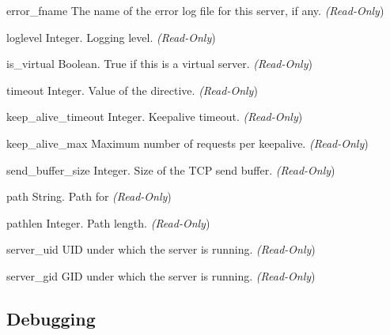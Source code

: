 \begin{memberdesc}[server]{error_fname}
The name of the error log file for this server, if any.
\emph{(Read-Only})
\end{memberdesc}

\begin{memberdesc}[server]{loglevel}
Integer. Logging level.
\emph{(Read-Only})
\end{memberdesc}

\begin{memberdesc}[server]{is_virtual}
Boolean. True if this is a virtual server.
\emph{(Read-Only})
\end{memberdesc}

\begin{memberdesc}[server]{timeout}
Integer. Value of the  directive.
\emph{(Read-Only})
\end{memberdesc}

\begin{memberdesc}[server]{keep_alive_timeout}
Integer. Keepalive timeout.
\emph{(Read-Only})
\end{memberdesc}

\begin{memberdesc}[server]{keep_alive_max}
Maximum number of requests per keepalive.
\emph{(Read-Only})
\end{memberdesc}

\begin{memberdesc}[server]{send_buffer_size}
Integer. Size of the TCP send buffer.
\emph{(Read-Only})
\end{memberdesc}

\begin{memberdesc}[server]{path}
String. Path for 
\emph{(Read-Only})
\end{memberdesc}

\begin{memberdesc}[server]{pathlen}
Integer. Path length.
\emph{(Read-Only})
\end{memberdesc}

\begin{memberdesc}[server]{server_uid}
UID under which the server is running.
\emph{(Read-Only})
\end{memberdesc}

\begin{memberdesc}[server]{server_gid}
GID under which the server is running.
\emph{(Read-Only})
\end{memberdesc}

\subsection{Debugging\label{pyapi-debug}}

